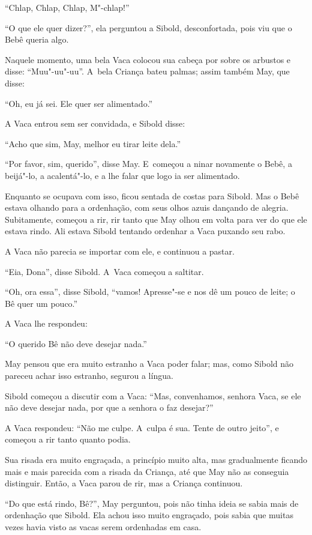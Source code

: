 ``Chlap, Chlap, Chlap, M"-chlap!''

``O que ele quer dizer?'', ela perguntou a Sibold, desconfortada, pois
viu que o Bebê queria algo.

Naquele momento, uma bela Vaca colocou sua cabeça por sobre os arbustos
e disse: ``Muu"-uu"-uu''. A~bela Criança bateu palmas; assim também May,
que disse:

``Oh, eu já sei. Ele quer ser alimentado.''

A Vaca entrou sem ser convidada, e Sibold disse:

``Acho que sim, May, melhor eu tirar leite dela.''

``Por favor, sim, querido'', disse May. E~começou a ninar novamente o
Bebê, a beijá"-lo, a acalentá"-lo, e a lhe falar que logo ia ser
alimentado.

Enquanto se ocupava com isso, ficou sentada de costas para Sibold.
Mas o Bebê estava olhando para a ordenhação, com seus olhos azuis
dançando de alegria. Subitamente, começou a rir, rir tanto que May olhou
em volta para ver do que ele estava rindo. Ali estava Sibold tentando
ordenhar a Vaca puxando seu rabo.

A Vaca não parecia se importar com ele, e continuou a pastar.

``Eia, Dona'', disse Sibold. A~Vaca começou a saltitar.

``Oh, ora essa'', disse Sibold, ``vamos! Apresse"-se e nos dê um pouco de
leite; o Bê quer um pouco.''

A Vaca lhe respondeu:

``O querido Bê não deve desejar nada.''

May pensou que era muito estranho a Vaca poder falar; mas, como Sibold
não pareceu achar isso estranho, segurou a língua.

Sibold começou a discutir com a Vaca: ``Mas, convenhamos, senhora Vaca,
se ele não deve desejar nada, por que a senhora o faz desejar?''

A Vaca respondeu: ``Não me culpe. A~culpa é sua. Tente de outro jeito'',
e começou a rir tanto quanto podia.

Sua risada era muito engraçada, a princípio muito alta, mas gradualmente
ficando mais e mais parecida com a risada da Criança, até que May não as
conseguia distinguir. Então, a Vaca parou de rir, mas a Criança
continuou.

``Do que está rindo, Bê?'', May perguntou, pois não tinha ideia se sabia
mais de ordenhação que Sibold. Ela achou isso muito engraçado, pois
sabia que muitas vezes havia visto as vacas serem ordenhadas em casa.

